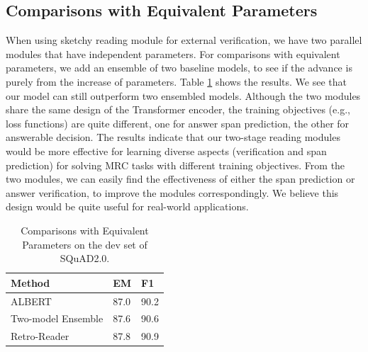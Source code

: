 \documentclass[letterpaper]{article} %
\begin{document}
\subsection{Comparisons with Equivalent Parameters}
When using sketchy reading module for external verification, we have two parallel modules that have independent parameters. For comparisons with equivalent parameters, we add an ensemble of two baseline models, to see if the advance is purely from the increase of parameters. Table \ref{tableequ} shows the results. We see that our model can still outperform two ensembled models. Although the two modules share the same design of the Transformer encoder, the training objectives (e.g., loss functions) are quite different, one for answer span prediction, the other for answerable decision. The results indicate that our two-stage reading modules would be more effective for learning diverse aspects (verification and span prediction) for solving MRC tasks with different training objectives. From the two modules, we can easily find the effectiveness of either the span prediction or answer verification, to improve the modules correspondingly. We believe this design would be quite useful for real-world applications.

\begin{table}
	\begin{center}
		\setlength{\tabcolsep}{13.5pt}
		{
			\begin{tabular}{lll}
				\toprule
				\textbf{Method}	& \textbf{EM} & \textbf{F1} \\
				\midrule
				ALBERT & 87.0 & 90.2  \\
				Two-model Ensemble & 87.6  &  90.6    \\
				Retro-Reader  &  87.8 & 90.9  \\
				\bottomrule
			\end{tabular}
		}
	\end{center}
	\caption{\label{tableequ} Comparisons with Equivalent Parameters on the dev set of SQuAD2.0.}
\end{table}
\end{document}
